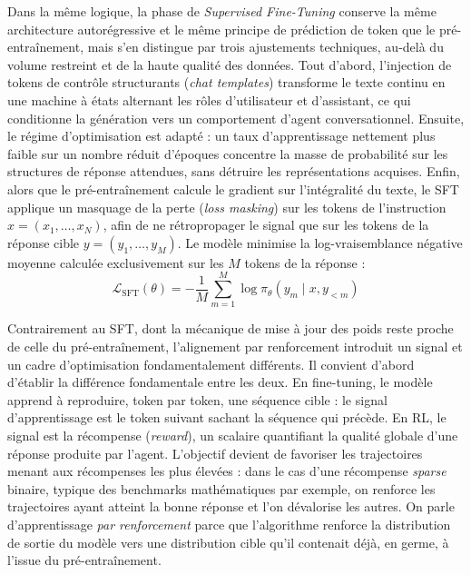 \documentclass[11pt,a4paper]{article}
\begin{document}
Dans la même logique, la phase de \emph{Supervised Fine-Tuning} conserve la même architecture autorégressive et le même principe de prédiction de token que le pré-entraînement, mais s'en distingue par trois ajustements techniques, au-delà du volume restreint et de la haute qualité des données. Tout d'abord, l'injection de tokens de contrôle structurants (\emph{chat templates}) transforme le texte continu en une machine à états alternant les rôles d'utilisateur et d'assistant, ce qui conditionne la génération vers un comportement d'agent conversationnel. Ensuite, le régime d'optimisation est adapté : un taux d'apprentissage nettement plus faible sur un nombre réduit d'époques concentre la masse de probabilité sur les structures de réponse attendues, sans détruire les représentations acquises. Enfin, alors que le pré-entraînement calcule le gradient sur l'intégralité du texte, le SFT applique un masquage de la perte (\emph{loss masking}) sur les tokens de l'instruction $x = (x_1, \dots, x_N)$, afin de ne rétropropager le signal que sur les tokens de la réponse cible $y = (y_1, \dots, y_M)$. Le modèle minimise la log-vraisemblance négative moyenne calculée exclusivement sur les $M$ tokens de la réponse :
\begin{equation}
\mathcal{L}_{\text{SFT}}(\theta) = -\frac{1}{M} \sum_{m=1}^{M} \log \pi_\theta(y_m \mid x, y_{<m})
\end{equation}

Contrairement au SFT, dont la mécanique de mise à jour des poids reste proche de celle du pré-entraînement, l'alignement par renforcement introduit un signal et un cadre d'optimisation fondamentalement différents. Il convient d'abord d'établir la différence fondamentale entre les deux. En fine-tuning, le modèle apprend à reproduire, token par token, une séquence cible : le signal d'apprentissage est le token suivant sachant la séquence qui précède. En RL, le signal est la récompense (\emph{reward}), un scalaire quantifiant la qualité globale d'une réponse produite par l'agent. L'objectif devient de favoriser les trajectoires menant aux récompenses les plus élevées : dans le cas d'une récompense \emph{sparse} binaire, typique des benchmarks mathématiques par exemple, on renforce les trajectoires ayant atteint la bonne réponse et l'on dévalorise les autres. On parle d'apprentissage \emph{par renforcement} parce que l'algorithme renforce la distribution de sortie du modèle vers une distribution cible qu'il contenait déjà, en germe, à l'issue du pré-entraînement.
\end{document}
